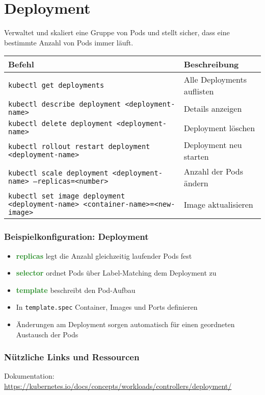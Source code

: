 \newpage
\section{Deployment}
Verwaltet und skaliert eine Gruppe von Pods und stellt sicher, dass eine bestimmte Anzahl von Pods immer läuft. \\

\noindent
\begin{tabular}{|p{}|p{}|}
\hline
\textbf{Befehl} & \textbf{Beschreibung} \\
\hline
\texttt{kubectl get deployments} & Alle Deployments auflisten \\
\texttt{kubectl describe deployment <deployment-name>} & Details anzeigen \\
\texttt{kubectl delete deployment <deployment-name>} & Deployment löschen \\
\texttt{kubectl rollout restart deployment <deployment-name>} & Deployment neu starten \\
\texttt{kubectl scale deployment <deployment-name> --replicas=<number>} & Anzahl der Pods ändern \\
\texttt{kubectl set image deployment <deployment-name> <container-name>=<new-image>} & Image aktualisieren \\
\hline
\end{tabular}
\noindent
\subsubsection{Beispielkonfiguration: Deployment}

\begin{itemize}
    \item \textcolor{ForestGreen}{\textbf{replicas}} legt die Anzahl gleichzeitig laufender Pods fest
    \item \textcolor{ForestGreen}{\textbf{selector}} ordnet Pods über Label-Matching dem Deployment zu
    \item \textcolor{ForestGreen}{\textbf{template}} beschreibt den Pod-Aufbau
    \item In \texttt{template.spec} Container, Images und Ports definieren
    \item Änderungen am Deployment sorgen automatisch für einen geordneten Austausch der Pods
\end{itemize}
\subsubsection{Nützliche Links und Ressourcen}
Dokumentation: \url{https://kubernetes.io/docs/concepts/workloads/controllers/deployment/}
\newpage

